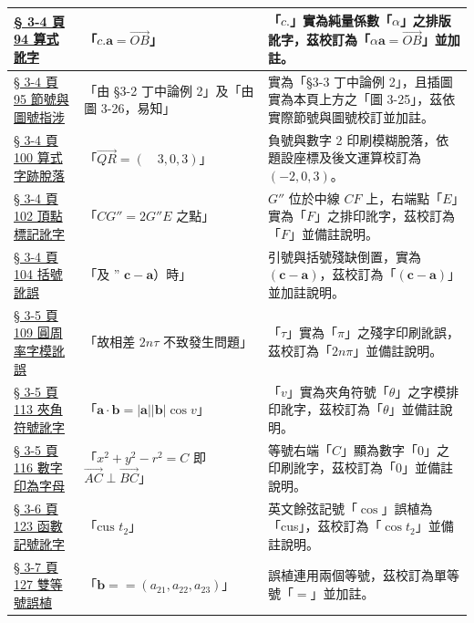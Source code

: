 \documentclass[a4paper,12pt,twoside]{article}
\begin{document}
\begin{table}[H]
\begin{tabularx}{\textwidth}{|p{3.2cm}|p{3.8cm}|X|}
\hyperref[note:b3s-ch3-p94-alpha-c-typo]{§ 3-4 頁 94 算式訛字} & 
「$c.\mathbf{a} = \vec{OB}$」 & 
「$c.$」實為純量係數「$\alpha$」之排版訛字，茲校訂為「$\alpha\mathbf{a} = \vec{OB}$」並加註。 \\ \hline

\hyperref[note:b3s-ch3-p95-ex2-ref]{§ 3-4 頁 95 節號與圖號指涉} & 
「由 §3-2 丁中論例 2」及「由圖 3-26，易知」 & 
實為「§3-3 丁中論例 2」，且插圖實為本頁上方之「圖 3-25」，茲依實際節號與圖號校訂並加註。 \\ \hline

\hyperref[note:b3s-ch3-p100-qr-typo]{§ 3-4 頁 100 算式字跡脫落} & 
「$\vec{QR} = (\quad 3, 0, 3)$」 & 
負號與數字 2 印刷模糊脫落，依題設座標及後文運算校訂為 $(-2, 0, 3)$。 \\ \hline

\hyperref[note:b3s-ch3-p102-ge-typo]{§ 3-4 頁 102 頂點標記訛字} & 
「$CG'' = 2G''E$ 之點」 & 
$G''$ 位於中線 $CF$ 上，右端點「$E$」實為「$F$」之排印訛字，茲校訂為「$F$」並備註說明。 \\ \hline

\hyperref[note:b3s-ch3-p104-prob7-typo]{§ 3-4 頁 104 括號訛誤} & 
「及 $\text{'' }\mathbf{c}-\mathbf{a}$）時」 & 
引號與括號殘缺倒置，實為 $(\mathbf{c}-\mathbf{a})$，茲校訂為「$(\mathbf{c}-\mathbf{a})$」並加註說明。 \\ \hline

\hyperref[note:b3s-ch3-p109-tau-typo]{§ 3-5 頁 109 圓周率字模訛誤} & 
「故相差 $2n\tau$ 不致發生問題」 & 
「$\tau$」實為「$\pi$」之殘字印刷訛誤，茲校訂為「$2n\pi$」並備註說明。 \\ \hline

\hyperref[note:b3s-ch3-p113-cos-theta-typo]{§ 3-5 頁 113 夾角符號訛字} & 
「$\mathbf{a}\cdot\mathbf{b} = |\mathbf{a}||\mathbf{b}|\cos v$」 & 
「$v$」實為夾角符號「$\theta$」之字模排印訛字，茲校訂為「$\theta$」並備註說明。 \\ \hline

\hyperref[note:b3s-ch3-p116-ac-bc-zero]{§ 3-5 頁 116 數字印為字母} & 
「$x^2+y^2-r^2 = C$ 即 $\vec{AC}\perp\vec{BC}$」 & 
等號右端「$C$」顯為數字「$0$」之印刷訛字，茲校訂為「$0$」並備註說明。 \\ \hline

\hyperref[note:b3s-ch3-p123-cust2-typo]{§ 3-6 頁 123 函數記號訛字} & 
「$\text{cus } t_2$」 & 
英文餘弦記號「$\cos$」誤植為「cus」，茲校訂為「$\cos t_2$」並備註說明。 \\ \hline

\hyperref[note:b3s-ch3-p127-double-eq]{§ 3-7 頁 127 雙等號誤植} & 
「$\mathbf{b} == (a_{21}, a_{22}, a_{23})$」 & 
誤植連用兩個等號，茲校訂為單等號「$=$」並加註。 \\ \hline

\end{tabularx}
\end{table}

\clearpage
\tableofcontents
\newpage

\setcounter{section}{2}

\end{document}
